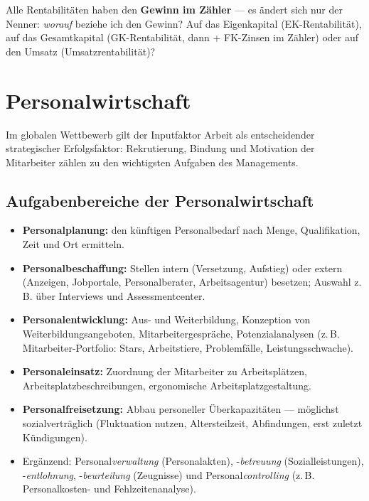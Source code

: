 \documentclass[11pt, a4paper]{article}
\begin{document}
\begin{merksatz}[title={\bfseries Merkhilfe zu den Rentabilitäten}]
Alle Rentabilitäten haben den \textbf{Gewinn im Zähler} --- es ändert sich nur der
Nenner: \emph{worauf} beziehe ich den Gewinn? Auf das Eigenkapital
(EK-Rentabilität), auf das Gesamtkapital (GK-Rentabilität, dann + FK-Zinsen im
Zähler) oder auf den Umsatz (Umsatzrentabilität)?
\end{merksatz}

\section{Personalwirtschaft}

Im globalen Wettbewerb gilt der Inputfaktor Arbeit als entscheidender strategischer
Erfolgsfaktor: Rekrutierung, Bindung und Motivation der Mitarbeiter zählen zu den
wichtigsten Aufgaben des Managements.

\subsection{Aufgabenbereiche der Personalwirtschaft}

\begin{itemize}
  \item \textbf{Personalplanung:} den künftigen Personalbedarf nach Menge, Qualifikation,
    Zeit und Ort ermitteln.
  \item \textbf{Personalbeschaffung:} Stellen intern (Versetzung, Aufstieg) oder extern
    (Anzeigen, Jobportale, Personalberater, Arbeitsagentur) besetzen; Auswahl z.\,B. über
    Interviews und Assessmentcenter.
  \item \textbf{Personalentwicklung:} Aus- und Weiterbildung, Konzeption von
    Weiterbildungsangeboten, Mitarbeitergespräche, Potenzialanalysen
    (z.\,B. Mitarbeiter-Portfolio: Stars, Arbeitstiere, Problemfälle, Leistungsschwache).
  \item \textbf{Personaleinsatz:} Zuordnung der Mitarbeiter zu Arbeitsplätzen,
    Arbeitsplatzbeschreibungen, ergonomische Arbeitsplatzgestaltung.
  \item \textbf{Personalfreisetzung:} Abbau personeller Überkapazitäten --- möglichst
    sozialverträglich (Fluktuation nutzen, Altersteilzeit, Abfindungen, erst zuletzt
    Kündigungen).
  \item Ergänzend: Personal\emph{verwaltung} (Personalakten), -\emph{betreuung}
    (Sozialleistungen), -\emph{entlohnung}, -\emph{beurteilung} (Zeugnisse) und
    Personal\emph{controlling} (z.\,B. Personalkosten- und Fehlzeitenanalyse).
\end{itemize}
\end{document}
